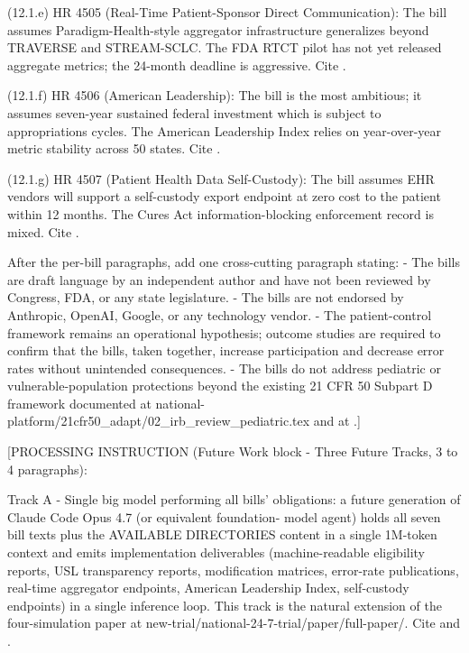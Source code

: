 (12.1.e) HR 4505 (Real-Time Patient-Sponsor Direct Communication):
The bill assumes Paradigm-Health-style aggregator infrastructure
generalizes beyond TRAVERSE and STREAM-SCLC. The FDA RTCT pilot has
not yet released aggregate metrics; the 24-month deadline is
aggressive. Cite \cite{fda_rtct_press_2026}.

(12.1.f) HR 4506 (American Leadership): The bill is the most
ambitious; it assumes seven-year sustained federal investment which
is subject to appropriations cycles. The American Leadership Index
relies on year-over-year metric stability across 50 states. Cite
\cite{rank4_fdora_fda_modernization_2022}.

(12.1.g) HR 4507 (Patient Health Data Self-Custody): The bill
assumes EHR vendors will support a self-custody export endpoint at
zero cost to the patient within 12 months. The Cures Act
information-blocking enforcement record is mixed. Cite
\cite{federal_register_info_blocking_disincentives_2024}.

After the per-bill paragraphs, add one cross-cutting paragraph
stating:
- The bills are draft language by an independent author and have
  not been reviewed by Congress, FDA, or any state legislature.
- The bills are not endorsed by Anthropic, OpenAI, Google, or any
  technology vendor.
- The patient-control framework remains an operational hypothesis;
  outcome studies are required to confirm that the bills, taken
  together, increase participation and decrease error rates without
  unintended consequences.
- The bills do not address pediatric or vulnerable-population
  protections beyond the existing 21 CFR 50 Subpart D framework
  documented at national-platform/21cfr50\_adapt/02\_irb\_review\_pediatric.tex
  and at \cite{kawchak_2026_19040707}.]

[PROCESSING INSTRUCTION (Future Work block - Three Future Tracks, 3
to 4 paragraphs):

Track A - Single big model performing all bills' obligations: a
future generation of Claude Code Opus 4.7 (or equivalent foundation-
model agent) holds all seven bill texts plus the AVAILABLE
DIRECTORIES content in a single 1M-token context and emits
implementation deliverables (machine-readable eligibility reports,
USL transparency reports, modification matrices, error-rate
publications, real-time aggregator endpoints, American Leadership
Index, self-custody endpoints) in a single inference loop. This
track is the natural extension of the four-simulation paper at
new-trial/national-24-7-trial/paper/full-paper/. Cite
\cite{kawchak_2026_19994945} and \cite{claude_opus_47}.

